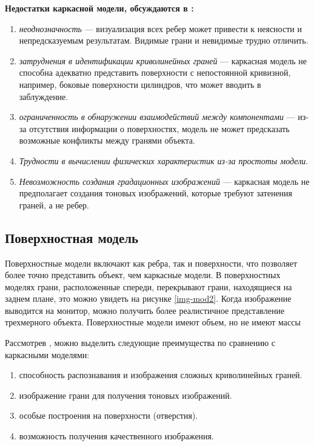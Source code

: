 \textbf{Недостатки каркасной модели, обсуждаются в \cite{model_geom_01}:}
\begin{enumerate}
      \item \textit{неоднозначность} --- визуализация всех ребер может привести к неясности и непредсказуемым результатам. Видимые грани и невидимые трудно отличить.
      \item \textit{затруднения в идентификации криволинейных граней} --- каркасная модель не способна адекватно представить поверхности с непостоянной кривизной, например, боковые поверхности цилиндров, что может вводить в заблуждение.
      \item \textit{ограниченность в обнаружении взаимодействий между компонентами} --- из-за отсутствия информации о поверхностях, модель не может предсказать возможные конфликты между гранями объекта. 
    		
    \item \textit{Трудности в вычислении физических характеристик из-за простоты модели}.
   	\item \textit{Невозможность создания градационных изображений} --- каркасная модель не предполагает создания тоновых изображений, которые требуют затенения граней, а не ребер.
\end{enumerate}
   
\clearpage
  

\subsection{Поверхностная модель}

Поверхностные модели включают как ребра, так и поверхности, что позволяет более точно представить объект, чем каркасные модели. В поверхностных моделях грани, расположенные спереди, перекрывают грани, находящиеся на заднем плане, это можно увидеть на рисунке \ref{img-mod2}. Когда изображение выводится на монитор, можно получить более реалистичное представление трехмерного объекта. Поверхностные модели имеют объем, но не имеют массы \cite{model_geom}

Рассмотрев \cite{model_geom_01}, можно выделить следующие преимущества по сравнению с каркасными моделями:
\begin{enumerate}
\item способность распознавания и изображения сложных криволинейных граней.
\item изображение грани для получения тоновых изображений.
\item особые построения на поверхности (отверстия).
\item возможность получения качественного изображения.
\end{enumerate}

